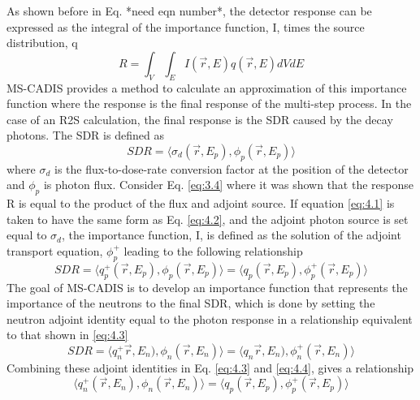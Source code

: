 As shown before in Eq. *need eqn number*, the detector response can be
expressed as the integral of the importance function, I, times the source
distribution, q
\begin{equation} \label{eq:4.1}
R = \int_{V}\int_{E} 
    I(\overrightarrow{r}, E)
    q(\overrightarrow{r}, E)
    dV dE
\end{equation}
MS-CADIS provides a method to calculate an approximation of this importance function
where the response is the final response of the multi-step process.  In the case
of an R2S calculation, the final response is the SDR caused by the decay
photons.  The SDR is defined as 
\begin{equation} \label{eq:4.2}
  SDR =  \langle \sigma_{d}(\overrightarrow{r},E_{p}),
  \phi_{p}(\overrightarrow{r}, E_{p}) \rangle
\end{equation}
where $\sigma_{d}$ is the flux-to-dose-rate conversion factor at the position of
the detector and $\phi_{p}$ is photon flux.
Consider Eq. \ref{eq:3.4} where it was shown that the response R is
equal to the product of the flux and adjoint source.  
If equation \ref{eq:4.1}
is taken to have the same form as Eq. \ref{eq:4.2}, and the adjoint photon
source is set equal to $\sigma_d$, the importance function, I,
is defined as the solution of the adjoint transport equation, $\phi_{p}^{+}$
leading to the following relationship
\begin{equation} \label{eq:4.3}
	SDR =  \langle q_{p}^{+}(\overrightarrow{r},E_{p}),
  \phi_{p}(\overrightarrow{r}, E_{p}) \rangle 
	= \langle q_{p}(\overrightarrow{r},E_{p}),
  \phi_{p}^{+}(\overrightarrow{r}, E_{p}) \rangle 
\end{equation}
The goal of MS-CADIS is to develop an importance function that represents the
importance of the neutrons to the final SDR, which is done by setting the
neutron adjoint identity equal to the photon response in a relationship
equivalent to that shown in \ref{eq:4.3}
\begin{equation} \label{eq:4.4}
  SDR =  \langle q_{n}^{+}\overrightarrow{r},E_{n}),
  \phi_{n}(\overrightarrow{r}, E_{n}) \rangle 
  = \langle q_{n}\overrightarrow{r},E_{n}),
  \phi_{n}^{+}(\overrightarrow{r}, E_{n}) \rangle 
\end{equation}
Combining these adjoint identities in Eq. \ref{eq:4.3} and \ref{eq:4.4}, 
gives a relationship
\begin{equation} \label{eq:4.5}
	\langle q_{n}^{+}(\overrightarrow{r},E_{n}),
  \phi_{n}(\overrightarrow{r}, E_{n}) \rangle 
	= \langle q_{p}(\overrightarrow{r},E_{p}),
  \phi_{p}^{+}(\overrightarrow{r}, E_{p}) \rangle 
\end{equation}

